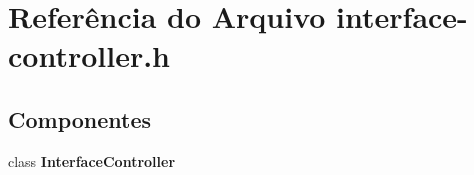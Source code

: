 \section{Referência do Arquivo interface-\/controller.h}
\label{interface-controller_8h}
\subsection*{Componentes}
\begin{DoxyCompactItemize}
\item 
class {\bf Interface\+Controller}
\end{DoxyCompactItemize}

